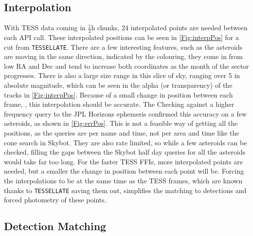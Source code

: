 \documentclass{UCreport}
\begin{document}
\subsection{Interpolation}\label{SubSec:Interp}



With TESS data coming in $\frac12\unit{\hour}$ chunks, 24 interpolated points are needed between each API call.
These interpolated positions can be seen in \autoref{Fig:interpPos} for a cut from \texttt{TESSELLATE}.
There are a few interesting features, such as the asteroids are moving in the same direction, indicated by the colouring, they come in from low RA and Dec and tend to increase both coordinates as the month of the sector progresses.
There is also a large size range in this slice of sky, ranging over \qty{5}{\mag} in absolute magnitude, which can be seen in the alpha (or transparency) of the tracks in \autoref{Fig:interpPos}.
Because of a small change in position between each frame, \citep[$\sim \qty{1}{\px}$ per frame][]{Pal2018}, this interpolation should be accurate.
The
Checking against a higher frequency query to the JPL Horizons ephemeris  confirmed this accuracy on a few asteroids, as shown in \autoref{Fig:errPos}.
This is not a feasible way of getting all the positions, as the queries are per name and time, not per area and time like the cone search in Skybot.
They are also rate limited, so while a few asteroids can be checked, filling the gaps between the Skybot half day queries for all the asteroids would take far too long.
For the faster TESS FFIs, more interpolated points are needed, but a smaller the change in position between each point will be.
Forcing the interpolations to be at the same time as the TESS frames, which are known thanks to \texttt{TESSELLATE} saving them out, simplifies the matching to detections and forced photometry of these points.



\subsection{Detection Matching}\label{SubSec:Match}
\end{document}
